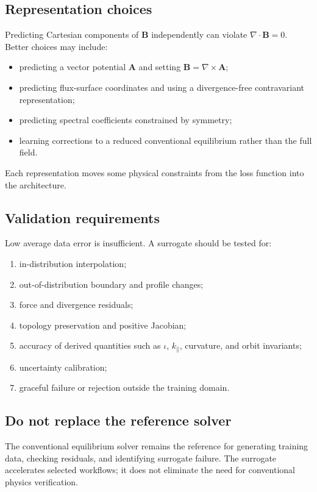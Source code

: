 \subsection{Representation choices}
Predicting Cartesian components of $\mathbf B$ independently can violate $\nabla\cdot\mathbf B=0$. Better choices may include:
\begin{itemize}[leftmargin=1.6em]
\item predicting a vector potential $\mathbf A$ and setting $\mathbf B=\nabla\times\mathbf A$;
\item predicting flux-surface coordinates and using a divergence-free contravariant representation;
\item predicting spectral coefficients constrained by symmetry;
\item learning corrections to a reduced conventional equilibrium rather than the full field.
\end{itemize}
Each representation moves some physical constraints from the loss function into the architecture.

\subsection{Validation requirements}
Low average data error is insufficient. A surrogate should be tested for:
\begin{enumerate}[leftmargin=1.6em]
\item in-distribution interpolation;
\item out-of-distribution boundary and profile changes;
\item force and divergence residuals;
\item topology preservation and positive Jacobian;
\item accuracy of derived quantities such as $\iota$, $k_\parallel$, curvature, and orbit invariants;
\item uncertainty calibration;
\item graceful failure or rejection outside the training domain.
\end{enumerate}

\subsection{Do not replace the reference solver}
The conventional equilibrium solver remains the reference for generating training data, checking residuals, and identifying surrogate failure. The surrogate accelerates selected workflows; it does not eliminate the need for conventional physics verification.


